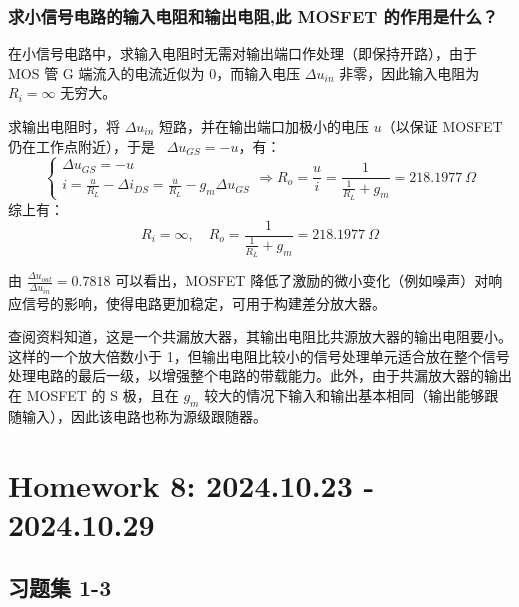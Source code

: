 \documentclass[UTF8]{report}
\theoremstyle{MyLineTheoremStyle} %
\theoremstyle{MyBlockTheoremStyle} %
\theoremstyle{MySubsubsectionStyle} %
\begin{document}
\subsection{求小信号电路的输入电阻和输出电阻,此 MOSFET 的作用是什么？}
在小信号电路中，求输入电阻时无需对输出端口作处理（即保持开路），由于 MOS 管 G 端流入的电流近似为 0，而输入电压 $\Delta u_{in}$ 非零，因此输入电阻为 $R_i = \infty$ 无穷大。

求输出电阻时，将 $\Delta u_{in}$ 短路，并在输出端口加极小的电压 $u$（以保证 MOSFET 仍在工作点附近），于是\ {\color{red} $\Delta u_{GS} = -u$}，有：
\begin{equation}
\begin{cases}
    \Delta u_{GS} = -u \\
    i = \frac{u}{R_L} - \Delta i_{DS} = \frac{u}{R_L} - g_m\Delta u_{GS}
\end{cases}
\Longrightarrow 
R_o = \frac{u}{i} = \frac{1}{\frac{1}{R_L} + g_m} = 218.1977 \ \Omega
\end{equation}
综上有：
\begin{equation}
R_i = \infty,\quad 
R_o = \frac{1}{\frac{1}{R_L} + g_m} =  218.1977 \ \Omega
\end{equation}

由 $\frac{\Delta u_{out}}{\Delta u_{in}} = 0.7818$ 可以看出，MOSFET 降低了激励的微小变化（例如噪声）对响应信号的影响，使得电路更加稳定，可用于构建差分放大器。

查阅资料知道，这是一个共漏放大器，其输出电阻比共源放大器的输出电阻要小。这样的一个放大倍数小于 1，但输出电阻比较小的信号处理单元适合放在整个信号处理电路的最后一级，以增强整个电路的带载能力。此外，由于共漏放大器的输出在 MOSFET 的 S 极，且在 $g_m$ 较大的情况下输入和输出基本相同（输出能够跟随输入），因此该电路也称为源级跟随器。

\chapter{Homework 8: 2024.10.23 - 2024.10.29}
\thispagestyle{fancy}

\section{习题集 1-3}
\end{document}
